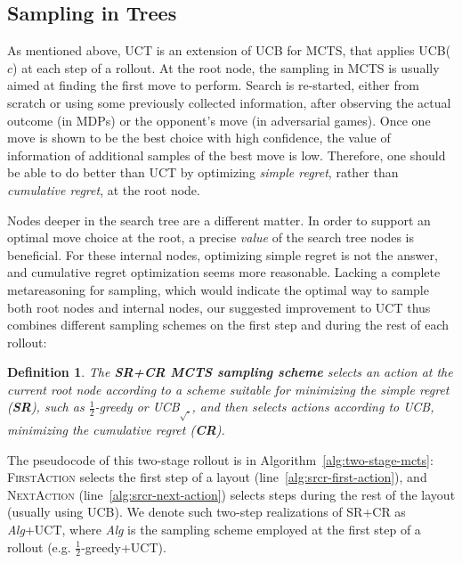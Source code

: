 \documentclass[letterpaper]{article}
\newtheorem{dfn}{Definition}
\begin{document}
\subsection{Sampling in Trees}
\label{sec:sampling-in-trees}

As mentioned above,
UCT \cite{Kocsis.uct} is an extension of UCB for MCTS, that
applies UCB($c$) at each step of a rollout.  At the root node,
the sampling in MCTS is usually aimed at finding the first move to perform. Search is re-started,
either from scratch or using some previously collected information,
after observing the actual outcome (in MDPs) or the opponent's move
(in adversarial games). Once one move is shown to be the best
choice with high confidence, the value of information of additional
samples of the best move is low. Therefore, one should be able to do
better than UCT by optimizing {\em simple regret}, rather than {\em
  cumulative regret}, at the root node.

Nodes deeper in the search tree are a different matter.
In order to support an optimal move choice at the root, a precise {\em value} of the search
tree nodes is beneficial. For these internal nodes, optimizing simple regret is not the answer, and 
cumulative regret optimization seems more reasonable. Lacking a complete metareasoning for sampling,
which would indicate the optimal way to sample both root nodes and internal nodes,
our suggested improvement to UCT thus combines different sampling schemes on the first step and
during the rest of each rollout:
\begin{dfn}
The \textbf{SR+CR MCTS sampling scheme} selects an action at the
current root node according to a scheme suitable for minimizing 
the simple regret (\textbf{SR}), such as $\frac 1 2$-greedy or UCB$_{\sqrt{\cdot}}$, and
then selects actions according to UCB, minimizing the cumulative regret (\textbf{CR}).
\end{dfn}

The pseudocode of this two-stage rollout is in
Algorithm~\ref{alg:two-stage-mcts}: \textsc{FirstAction} selects the first
step of a layout (line~\ref{alg:srcr-first-action}), and
\textsc{NextAction} (line~\ref{alg:srcr-next-action}) selects steps during
the rest of the layout (usually using UCB).
We denote such two-step realizations of SR+CR as \emph{Alg}+UCT, where
\emph{Alg} is the sampling scheme employed at the first step of a
rollout (e.g. $\frac 1 2$-greedy+UCT).
\end{document}

